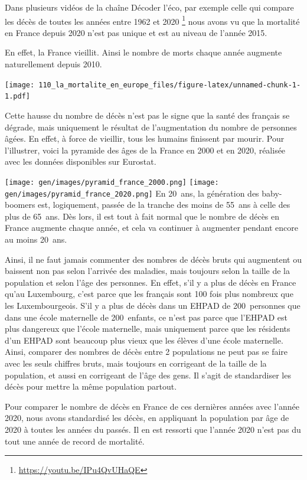 \documentclass[
]{article}
\begin{document}
Dans plusieurs vidéos de la chaîne Décoder l'éco, par exemple celle qui
compare les décès de toutes les années entre 1962 et 2020 \footnote{\url{https://youtu.be/IPu4QvUHaQE}}
nous avons vu que la mortalité en France depuis 2020 n'est pas unique et
est au niveau de l'année 2015.

En effet, la France vieillit. Ainsi le nombre de morts chaque année
augmente naturellement depuis 2010.

\texttt{[image: 110\_la\_mortalite\_en\_europe\_files/figure-latex/unnamed-chunk-1-1.pdf]}

Cette hausse du nombre de décès n'est pas le signe que la santé des
français se dégrade, mais uniquement le résultat de l'augmentation du
nombre de personnes âgées. En effet, à force de vieillir, tous les
humains finissent par mourir. Pour l'illustrer, voici la pyramide des
âges de la France en 2000 et en 2020, réalisée avec les données
disponibles sur Eurostat.

\texttt{[image: gen/images/pyramid\_france\_2000.png]}
\texttt{[image: gen/images/pyramid\_france\_2020.png]}
En 20~ans, la génération des baby-boomers est, logiquement, passée de la
tranche des moins de 55~ans à celle des plus de 65~ans. Dès lors, il est
tout à fait normal que le nombre de décès en France augmente chaque
année, et cela va continuer à augmenter pendant encore au moins 20~ans.

Ainsi, il ne faut jamais commenter des nombres de décès bruts qui
augmentent ou baissent non pas selon l'arrivée des maladies, mais
toujours selon la taille de la population et selon l'âge des personnes.
En effet, s'il y a plus de décès en France qu'au Luxembourg, c'est parce
que les français sont 100 fois plus nombreux que les Luxembourgeois.
S'il y a plus de décès dans un EHPAD de 200~personnes que dans une école
maternelle de 200~enfants, ce n'est pas parce que l'EHPAD est plus
dangereux que l'école maternelle, mais uniquement parce que les
résidents d'un EHPAD sont beaucoup plus vieux que les élèves d'une école
maternelle. Ainsi, comparer des nombres de décès entre 2 populations ne
peut pas se faire avec les seuls chiffres bruts, mais toujours en
corrigeant de la taille de la population, et aussi en corrigeant de
l'âge des gens. Il s'agit de standardiser les décès pour mettre la même
population partout.

Pour comparer le nombre de décès en France de ces dernières années avec
l'année 2020, nous avons standardisé les décès, en appliquant la
population par âge de 2020 à toutes les années du passés. Il en est
ressorti que l'année 2020 n'est pas du tout une année de record de
mortalité.
\end{document}

